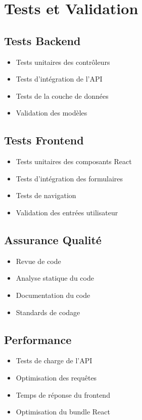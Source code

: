 \section{Tests et Validation}
\label{sec:tests_et_validation}

\subsection{Tests Backend}
\begin{itemize}
    \item Tests unitaires des contrôleurs
    \item Tests d'intégration de l'API
    \item Tests de la couche de données
    \item Validation des modèles
\end{itemize}

\subsection{Tests Frontend}
\begin{itemize}
    \item Tests unitaires des composants React
    \item Tests d'intégration des formulaires
    \item Tests de navigation
    \item Validation des entrées utilisateur
\end{itemize}

\subsection{Assurance Qualité}
\begin{itemize}
    \item Revue de code
    \item Analyse statique du code
    \item Documentation du code
    \item Standards de codage
\end{itemize}

\subsection{Performance}
\begin{itemize}
    \item Tests de charge de l'API
    \item Optimisation des requêtes
    \item Temps de réponse du frontend
    \item Optimisation du bundle React
\end{itemize}
